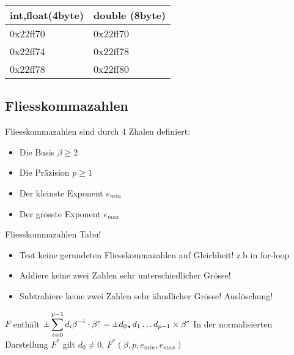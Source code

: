 \begin{center}
	\begin{tabular}{ ll } 
		\hline
int,float(4byte) & double (8byte)\\
\hline
0x22ff70 & 0x22ff70\\
0x22ff74 & 0x22ff78\\
0x22ff78 & 0x22ff80\\
		\hline
	\end{tabular}
\end{center}

\subsection{Fliesskommazahlen}
Fliesskommazahlen sind durch 4 Zhalen definiert:
\begin{itemize}
	\item Die Basis $\beta \geqslant 2$
	\item Die Präzision $p \geqslant 1$
	\item Der kleinste Exponent $e_{min}$
	\item Der grösste Exponent	$e_{max}$
\end{itemize}
Fliesskommazahlen Tabu!
\begin{itemize}
	\item Test keine gerundeten Fliesskommazahlen auf Gleichheit! z.b in for-loop
	\item Addiere keine zwei Zahlen  sehr unterschiedlicher Grösse! 
	\item Subtrahiere keine zwei Zahlen sehr ähndlicher Grösse! Auslöschung!

\end{itemize}
$F$ enthält $\displaystyle \pm\sum_{i=0}^{p-1}d_i \beta^{-i}\cdot \beta^{e} =  \pm d_{0\text{\textbullet}} d_1\dots d_{p-1} \times \beta^e$
In der normalisierten Darstellung $F^{\ast}$ gilt $d_0 \neq 0$, $F^{\ast}(\beta,p,e_{min},e_{max})$ 

